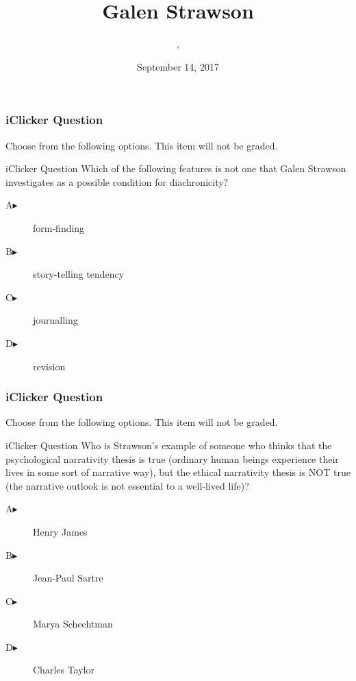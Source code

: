 \documentclass[xcolor=dvipsnames]{beamer}
\title{Galen Strawson}
\subtitle{{\CourseNumber}, {\CourseInst}}
\author{\CourseName}
\date{September 14, 2017}
\begin{document}
\begin{frame}
  \titlepage
\end{frame}


\begin{frame}
  \frametitle{iClicker Question}
Choose from the following options. This item will not be graded.
\begin{block}{iClicker Question}
Which of the following features is not one that Galen Strawson
investigates as a possible condition for diachronicity?
\end{block}
\begin{description}
\item[A\hspace{.2in}$\blacktriangleright$] form-finding
\item[B\hspace{.2in}$\blacktriangleright$] story-telling tendency
\item[C\hspace{.2in}$\blacktriangleright$] journalling
\item[D\hspace{.2in}$\blacktriangleright$] revision
\end{description}
\end{frame}

\begin{frame}
  \frametitle{iClicker Question}
Choose from the following options. This item will not be graded.
\begin{block}{iClicker Question}
Who is Strawson's example of someone who thinks that the psychological
narrativity thesis is true (ordinary human beings experience their
lives in some sort of narrative way), but the ethical narrativity
thesis is NOT true (the narrative outlook is not essential to a
well-lived life)?
\end{block}
\begin{description}
\item[A\hspace{.2in}$\blacktriangleright$] Henry James
\item[B\hspace{.2in}$\blacktriangleright$] Jean-Paul Sartre
\item[C\hspace{.2in}$\blacktriangleright$] Marya Schechtman
\item[D\hspace{.2in}$\blacktriangleright$] Charles Taylor
\end{description}
\end{frame}
\end{document}
